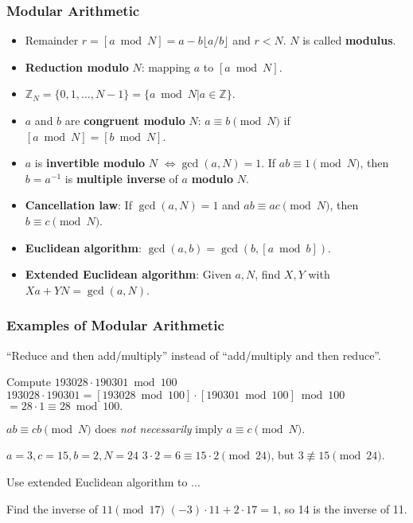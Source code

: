 \begin{frame}\frametitle{Modular Arithmetic}
\begin{itemize}
\item Remainder $r= [a\bmod N] = a - b\lfloor a/b\rfloor $  and $r<N$. $N$ is called \textbf{modulus}.
\item \textbf{Reduction modulo} $N$: mapping $a$ to $[a \bmod N]$.
\item $\mathbb{Z}_N = \{0,1,\dots,N-1\} = \{a \bmod N | a \in \mathbb{Z}\}$.
\item $a$ and $b$ are \textbf{congruent modulo} $N$: $a \equiv b \pmod N$ if $[a \bmod N] = [b \bmod N]$.
\item $a$ is \textbf{invertible modulo} $N$ $\iff \gcd(a,N) = 1$. If $ab \equiv 1 \pmod N$, then $b=a^{-1}$ is \textbf{multiple inverse} of $a$ \textbf{modulo} $N$.
\item \textbf{Cancellation law}: If $\gcd(a,N)=1$ and $ab \equiv ac \pmod N$, then $b \equiv c \pmod N$.
\item \textbf{Euclidean algorithm}: $\gcd(a,b) = \gcd(b, [a \bmod b]).$
\item \textbf{Extended Euclidean algorithm}: Given $a,N$, find $X,Y$ with $Xa+YN = \gcd(a,N)$.
\end{itemize}
\end{frame}
\begin{frame}\frametitle{Examples of Modular Arithmetic}
``Reduce and then add/multiply'' instead of ``add/multiply and then reduce''.
\begin{exampleblock}{Compute $193028 \cdot 190301 \bmod 100$}
$193028 \cdot 190301 = [193028 \bmod 100] \cdot [190301 \bmod 100] \bmod 100$
$= 28\cdot 1 \equiv 28 \bmod 100.$
\end{exampleblock}
$ab \equiv cb \pmod N$ does \emph{not necessarily} imply $a \equiv c \pmod N$.
\begin{exampleblock}{$a=3, c=15, b=2, N=24$}
$3\cdot 2 = 6 \equiv 15 \cdot 2 \pmod{24}$, but $3 \not \equiv 15 \pmod{24}$.
\end{exampleblock}
Use extended Euclidean algorithm to ...
\begin{exampleblock}{Find the inverse of $11 \pmod {17}$}
$(-3)\cdot 11 + 2\cdot 17 = 1$, so 14 is the inverse of 11.
\end{exampleblock}
\end{frame}
